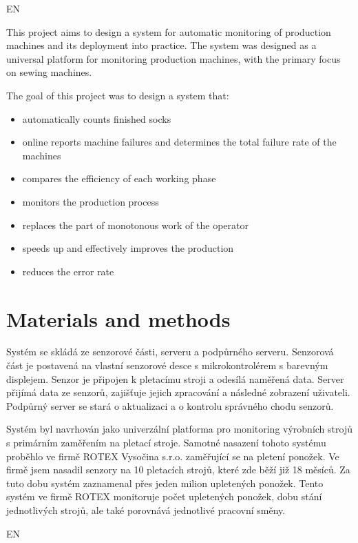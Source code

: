 \documentclass[12pt, a4paper]{article}
\begin{document}
EN

This project aims to design a system for automatic monitoring of production machines and its deployment into practice.
The system was designed as a universal platform for monitoring production machines, with the primary focus on sewing machines.

The goal of this project was to design a system that:

\begin{itemize}
    \item automatically counts finished socks
    \item online reports machine failures and determines the total failure rate of the machines
    \item compares the efficiency of each working phase
    \item monitors the production process
    \item replaces the part of monotonous work of the operator
    \item speeds up and effectively improves the production
    \item reduces the error rate
\end{itemize}


\section*{Materials and methods}

Systém se skládá ze senzorové části, serveru a podpůrného serveru.
Senzorová část je postavená na vlastní senzorové desce s mikrokontrolérem s barevným displejem.
Senzor je připojen k pletacímu stroji a odesílá naměřená data.
Server přijímá  data ze senzorů, zajišťuje jejich zpracování a následné zobrazení uživateli.
Podpůrný server se stará o aktualizaci a o kontrolu správného chodu senzorů.

Systém byl navrhován jako univerzální platforma pro monitoring výrobních strojů s primárním zaměřením na pletací stroje.
Samotné nasazení tohoto systému proběhlo ve firmě ROTEX Vysočina s.r.o. zaměřující se na pletení ponožek.
Ve firmě jsem nasadil senzory na 10 pletacích strojů, které zde běží již 18 měsíců.
Za tuto dobu systém zaznamenal přes jeden milion upletených ponožek.
Tento systém ve firmě ROTEX monitoruje počet upletených ponožek, dobu stání jednotlivých strojů, ale také porovnává jednotlivé pracovní směny.

EN
\end{document}
